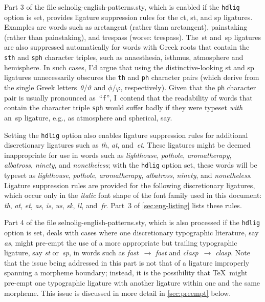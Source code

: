 \documentclass[11pt]{article}
\newcommand{\pkg}[1]{\textsf{#1}}
\newcommand{\opt}[1]{\texttt{#1}}
\begin{document}
Part 3 of the file \pkg{selnolig-english-patterns.sty}, which is enabled if the \opt{hdlig} option is set, provides ligature suppression rules for the ct, st, and sp ligatures. Examples are words such as arctangent (rather than ar\mbox{ct}angent), painstaking (rather than pain\mbox{st}aking), and trespass (worse: tre\mbox{sp}ass). The~st and~sp ligatures are also suppressed automatically for words with Greek roots that contain the \opt{sth} and \opt{sph} character triples, such as anaesthesia, isthmus, atmosphere and hemisphere. In such cases, I'd argue that using the distinctive-looking st and sp ligatures unnecessarily obscures the \opt{th} and \opt{ph} character pairs (which derive from the single Greek letters~$\theta$/$\vartheta$ and $\phi$/$\varphi$, respectively). Given that the \opt{ph} character pair is usually pronounced as~\enquote{\opt{f}}, I~contend that the readability of words that contain the character triple \opt{sph} would suffer badly if they were typeset \emph{with} an~sp ligature, e.g., as atmo\mbox{sp}here and \mbox{sp}herical, say.

Setting the \opt{hdlig} option also enables ligature suppression rules for additional discretionary ligatures such as \emph{th}, \emph{at}, and~\emph{et}. These ligatures might be deemed inappropriate for use in words such as \emph{ligh\mbox{th}ouse}, \emph{po\mbox{th}ole}, \emph{arom\mbox{at}herapy}, \emph{alb\mbox{at}ross}, \emph{nin\mbox{et}y}, and \emph{non\mbox{et}heless}; with the \opt{hdlig} option set, these words will be typeset as \emph{lighthouse}, \emph{pothole}, \emph{aromatherapy}, \emph{albatross}, \emph{ninety}, and \emph{nonetheless}. Ligature suppression rules are provided for the following discretionary ligatures, which occur only in the \emph{italic} font shape of the font family used in this document: \emph{th}, \emph{at}, \emph{et}, \emph{as}, \emph{is}, \emph{us}, {\ebg \emph{sk}}, \emph{ll}, and~\emph{fr}. Part~3 of \cref{sec:eng-listing} lists these rules.

Part 4 of the file \pkg{selnolig-english-patterns.sty}, which is also processed if the \opt{hdlig} option is set, deals with cases where one discretionary typographic literature, say \emph{as}, might pre-empt the use of a more appropriate but trailing typographic ligature, say \emph{st} or~\emph{sp}, in words such as \emph{f\mbox{as}t}~$\to$ \emph{fa\mbox{st}} and \emph{cl\mbox{as}p}~$\to$ \emph{cla\mbox{sp}}. Note that the issue being addressed in this part is not that of a ligature improperly spanning a morpheme boundary; instead, it is the possibility that \TeX\ might pre-empt one typographic ligature with another ligature within one and the same morpheme. This issue is discussed in more detail in \cref{sec:preempt} below.
\end{document}
